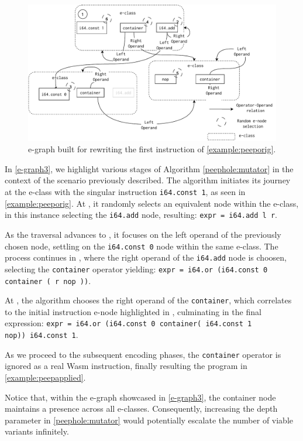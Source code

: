 


\begin{figure}
    \centering
    \includegraphics[width=1.0\linewidth]{figures/e-graph-traversal2.pdf}
    \caption{e-graph built for rewriting the first instruction of \autoref{example:peeporig}. }
  \label{e-graph3}
\end{figure}



In \autoref{e-graph3}, we highlight various stages of Algorithm \ref{peephole:mutator} in the context of the scenario previously described. 
The algorithm initiates its journey at the e-class with the singular instruction \texttt{i64.const 1}, as seen in \autoref{example:peeporig}.
At , it randomly selects an equivalent node within the e-class, in this instance selecting the \texttt{i64.add} node, resulting: {\texttt{expr = i64.add l r}}.

As the traversal advances to , it focuses on the left operand of the previously chosen node, settling on the \texttt{i64.const 0} node within the same e-class.
The process continues in , where the right operand of the \texttt{i64.add} node is choosen, selecting the \texttt{container} operator yielding:
{\texttt{expr = i64.or (i64.const 0 container ( r nop ))}}.

At , the algorithm chooses the right operand of the \texttt{container}, which correlates to the initial instruction e-node highlighted in , culminating in the final expression:
{\texttt{expr = i64.or (i64.const 0 container( i64.const 1 nop))\ i64.const 1}}.

As we proceed to the subsequent encoding phases, the \texttt{container} operator is ignored as a real Wasm instruction, finally resulting the program in \autoref{example:peepapplied}.

Notice that, within the e-graph showcased in \autoref{e-graph3}, the container node maintains a presence across all e-classes. 
Consequently, increasing the depth parameter in \autoref{peephole:mutator} would potentially escalate the number of viable variants infinitely.


